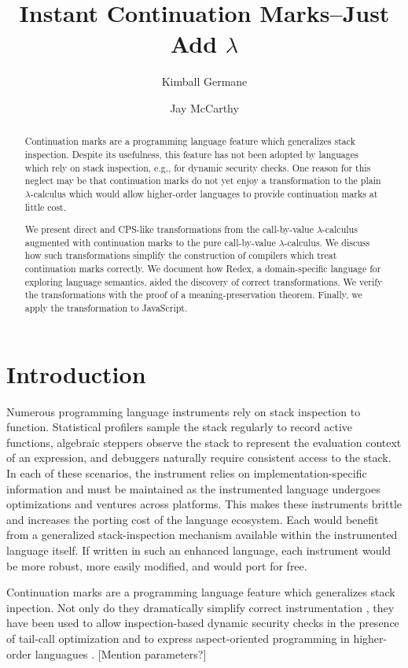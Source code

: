 \documentclass{llncs}
\title{Instant Continuation Marks--Just Add $\lambda$}
\author{Kimball Germane \and Jay McCarthy}
\institute{Brigham Young University, Provo, Utah}
\begin{document}
\maketitle

\begin{abstract}
Continuation marks are a programming language feature which generalizes stack inspection. Despite its usefulness, this feature has not been adopted by languages which rely on stack inspection, e.g., for dynamic security checks. One reason for this neglect may be that continuation marks do not yet enjoy a transformation to the plain $\lambda$-calculus which would allow higher-order languages to provide continuation marks at little cost.

We present direct and CPS-like transformations from the call-by-value $\lambda$-calculus augmented with continuation marks to the pure call-by-value $\lambda$-calculus. We discuss how such transformations simplify the construction of compilers which treat continuation marks correctly. We document how Redex, a domain-specific language for exploring language semantics, aided the discovery of correct transformations. We verify the transformations with the proof of a meaning-preservation theorem. Finally, we apply the transformation to JavaScript.
\end{abstract}

\section{Introduction}

Numerous programming language instruments rely on stack inspection to function. Statistical profilers sample the stack regularly to record active functions, algebraic steppers observe the stack to represent the evaluation context of an expression, and debuggers naturally require consistent access to the stack. In each of these scenarios, the instrument relies on implementation-specific information and must be maintained as the instrumented language undergoes optimizations and ventures across platforms. This makes these instruments brittle and increases the porting cost of the language ecosystem. Each would benefit from a generalized stack-inspection mechanism available within the instrumented language itself. If written in such an enhanced language, each instrument would be more robust, more easily modified, and would port for free.

Continuation marks \cite{clements2006portable} are a programming language feature which generalizes stack inpection. Not only do they dramatically simplify correct instrumentation \cite{clements2001modeling}, they have been used to allow inspection-based dynamic security checks in the presence of tail-call optimization \cite{clements2004tail} and to express aspect-oriented programming in higher-order languagues \cite{tucker2003pointcuts}. [Mention parameters?]
\end{document}
